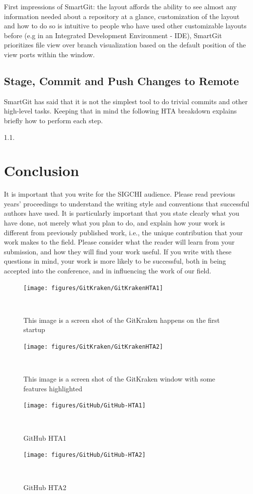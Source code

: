 \documentclass{sigchi}
\begin{document}
First impressions of SmartGit: the layout affords the ability to see almost any information needed about a repository at a glance,
customization of the layout and how to do so is intuitive to people who have used other customizable layouts before
(e.g in an Integrated Development Environment - IDE), SmartGit prioritizes file view over branch visualization based on the 
default position of the view ports within the window. 

\subsection{Stage, Commit and Push Changes to Remote}
SmartGit has said that it is not the simplest tool to do trivial commits and other high-level tasks.
Keeping that in mind the following HTA breakdown explains briefly how to perform each step.

1.1. 


\section{Conclusion}
It is important that you write for the SIGCHI audience. Please read
previous years' proceedings to understand the writing style and
conventions that successful authors have used. It is particularly
important that you state clearly what you have done, not merely what
you plan to do, and explain how your work is different from previously
published work, i.e., the unique contribution that your work makes to
the field. Please consider what the reader will learn from your
submission, and how they will find your work useful. If you write with
these questions in mind, your work is more likely to be successful,
both in being accepted into the conference, and in influencing the
work of our field.

\begin{figure}
  \centering
  \texttt{[image: figures/GitKraken/GitKrakenHTA1]}
  \caption{This image is a screen shot of the GitKraken happens on the first startup}~\label{fig:GitKrakenHTA1}
\end{figure}

\begin{figure}
  \centering
  \texttt{[image: figures/GitKraken/GitKrakenHTA2]}
  \caption{This image is a screen shot of the GitKraken window with some features highlighted}~\label{fig:GitKrakenHTA2}
\end{figure}

\begin{figure}
  \centering
  \texttt{[image: figures/GitHub/GitHub-HTA1]}
  \caption{GitHub HTA1}~\label{fig:GitHubHTA1}
\end{figure}

\begin{figure}
  \centering
  \texttt{[image: figures/GitHub/GitHub-HTA2]}
  \caption{GitHub HTA2}~\label{fig:GitHubHTA2}
\end{figure}

\balance{}



\end{document}
